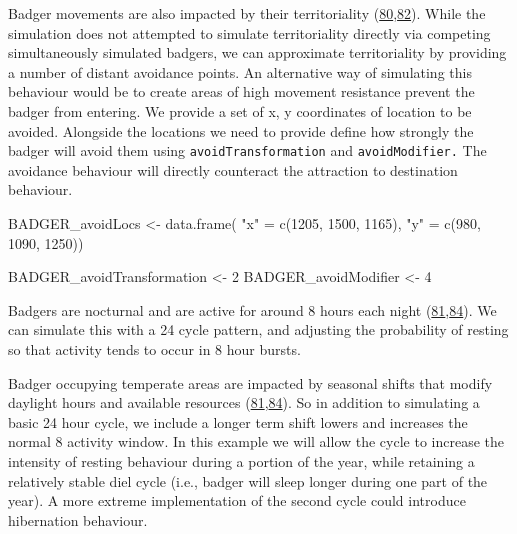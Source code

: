 \documentclass[10pt,a4paper]{article}
\newenvironment{Shaded}{}{}
\newcommand{\DecValTok}[1]{#1}
\newcommand{\FunctionTok}[1]{#1}
\newcommand{\NormalTok}[1]{#1}
\newcommand{\OtherTok}[1]{#1}
\newcommand{\StringTok}[1]{#1}
\begin{document}
Badger movements are also impacted by their territoriality (\protect\hyperlink{ref-feore_habitat_1999}{80},\protect\hyperlink{ref-kelly_extra_2020}{82}).
While the simulation does not attempted to simulate territoriality directly via competing simultaneously simulated badgers, we can approximate territoriality by providing a number of distant avoidance points.
An alternative way of simulating this behaviour would be to create areas of high movement resistance prevent the badger from entering.
We provide a set of x, y coordinates of location to be avoided.
Alongside the locations we need to provide define how strongly the badger will avoid them using \texttt{avoidTransformation} and \texttt{avoidModifier.}
The avoidance behaviour will directly counteract the attraction to destination behaviour.

\begin{Shaded}
\begin{Highlighting}[]
\NormalTok{BADGER\_avoidLocs }\OtherTok{\textless{}{-}} \FunctionTok{data.frame}\NormalTok{(}
  \StringTok{"x"} \OtherTok{=} \FunctionTok{c}\NormalTok{(}\DecValTok{1205}\NormalTok{, }\DecValTok{1500}\NormalTok{, }\DecValTok{1165}\NormalTok{),}
  \StringTok{"y"} \OtherTok{=} \FunctionTok{c}\NormalTok{(}\DecValTok{980}\NormalTok{, }\DecValTok{1090}\NormalTok{, }\DecValTok{1250}\NormalTok{))}

\NormalTok{BADGER\_avoidTransformation }\OtherTok{\textless{}{-}} \DecValTok{2}
\NormalTok{BADGER\_avoidModifier }\OtherTok{\textless{}{-}} \DecValTok{4}
\end{Highlighting}
\end{Shaded}

Badgers are nocturnal and are active for around 8 hours each night (\protect\hyperlink{ref-rosalino_activity_2005}{81},\protect\hyperlink{ref-magowan_dead-reckoning_2022}{84}).
We can simulate this with a 24 cycle pattern, and adjusting the probability of resting so that activity tends to occur in 8 hour bursts.

Badger occupying temperate areas are impacted by seasonal shifts that modify daylight hours and available resources (\protect\hyperlink{ref-rosalino_activity_2005}{81},\protect\hyperlink{ref-magowan_dead-reckoning_2022}{84}).
So in addition to simulating a basic 24 hour cycle, we include a longer term shift lowers and increases the normal 8 activity window.
In this example we will allow the cycle to increase the intensity of resting behaviour during a portion of the year, while retaining a relatively stable diel cycle (i.e., badger will sleep longer during one part of the year).
A more extreme implementation of the second cycle could introduce hibernation behaviour.
\end{document}
